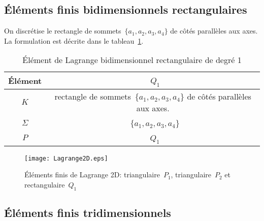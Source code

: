 \medskip
\subsection*{Éléments finis bidimensionnels rectangulaires}
On discrétise le rectangle de sommets~$\{a_1, a_2, a_3, a_4\}$ de côtés parallèles aux axes. La formulation est décrite dans le tableau~\ref{tab:Elem:bibi}.
\begin{table}[h!]\centering\small
\begin{tabular}{c|c}
Élément &~$Q_1$\\
\hline
$K$ & rectangle de sommets~$\{a_1, a_2, a_3, a_4\}$ de côtés parallèles aux axes.\\
$\Sigma$ &~$\{a_1, a_2, a_3, a_4\}$\\
$P$ &~$Q_1$\\
\hline
\end{tabular}
\caption{Élément de Lagrange bidimensionnel rectangulaire de degré 1}\label{tab:Elem:bibi}
\end{table}

\begin{figure}[ht]
\centering
\texttt{[image: Lagrange2D.eps]}
\caption{\label{Lagrange2D} Éléments finis de Lagrange 2D: triangulaire~$P_1$, triangulaire~$P_2$ et rectangulaire~$Q_1$}
\end{figure}

\medskip
\subsection*{Éléments finis tridimensionnels}


